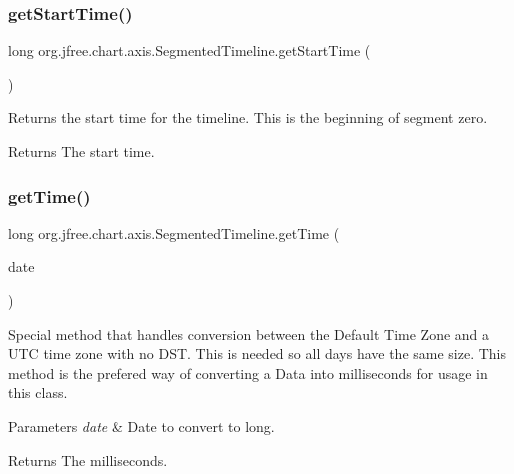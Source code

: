 \subsubsection{\texorpdfstring{get\+Start\+Time()}{getStartTime()}}
{\footnotesize\ttfamily long org.\+jfree.\+chart.\+axis.\+Segmented\+Timeline.\+get\+Start\+Time (\begin{DoxyParamCaption}{ }\end{DoxyParamCaption})}

Returns the start time for the timeline. This is the beginning of segment zero.

\begin{DoxyReturn}{Returns}
The start time. 
\end{DoxyReturn}
\mbox{\label{classorg_1_1jfree_1_1chart_1_1axis_1_1_segmented_timeline_aae736ac013f08ce15b1c7b4b001b297d}} 
\subsubsection{\texorpdfstring{get\+Time()}{getTime()}}
{\footnotesize\ttfamily long org.\+jfree.\+chart.\+axis.\+Segmented\+Timeline.\+get\+Time (\begin{DoxyParamCaption}\item[{Date}]{date }\end{DoxyParamCaption})}

Special method that handles conversion between the Default Time Zone and a U\+TC time zone with no D\+ST. This is needed so all days have the same size. This method is the prefered way of converting a Data into milliseconds for usage in this class.


\begin{DoxyParams}{Parameters}
{\em date} & Date to convert to long.\\
\hline
\end{DoxyParams}
\begin{DoxyReturn}{Returns}
The milliseconds. 
\end{DoxyReturn}
\mbox{\label{classorg_1_1jfree_1_1chart_1_1axis_1_1_segmented_timeline_aafeaa7cc2799e7b0baec67bf86489b62}} 
